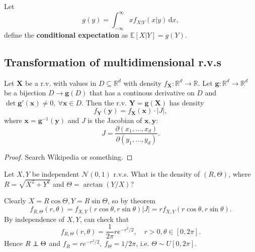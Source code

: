 \begin{definition}
    Let 
    \[
        g(y)=\int_{-\infty}^{\infty} xf_{X|Y}(x|y) \,\mathrm{d}x,
    \]
    define the \textbf{conditional expectation} as $ \mathbb{E}[X|Y]=g(Y) $.
\end{definition}

\subsection{Transformation of multidimensional r.v.s}
\begin{theorem}
    Let $\mathbf{X}$ be a r.v. with values in $ D \subseteq \mathbb{R}^{d} $ with density $ f_\mathbf{X}: \mathbb{R}^{d}\to \mathbb{R} $. Let $\mathbf{g}: \mathbb{R}^{d}\to \mathbb{R}^{d}$ be a bijection $ D \to \mathbf{g}(D) $ that has a continous derivative on $D$ and $ \det \mathbf{g}'(\mathbf{x})\neq 0,\ \forall \mathbf{x}\in D $. Then the r.v. $ \mathbf{Y}=\mathbf{g}(\mathbf{X}) $ has density 
    \[
        f_\mathbf{Y}(\mathbf{y}) = f_\mathbf{X}(\mathbf{x}) \cdot |J|,
    \]
    where $ \mathbf{x}=\mathbf{g}^{-1}(\mathbf{y}) $ and $J$ is the Jacobian of $ \mathbf{x},\mathbf{y} $:
    \[
        J = \frac{\partial (x_1,\dots,x_d)}{\partial (y_1,\dots, y_d)}.
    \]
\end{theorem}
\begin{proof}
    Search Wikipedia or something.
\end{proof}

\begin{example}
    Let $ X,Y $ be independent $ \mathcal{N}(0,1) $ r.v.s. What is the density of $ (R,\Theta) $, where $ R=\sqrt{X^2+Y^2} $ and $ \Theta = \arctan (Y/X) $?
    \begin{center}
    \end{center}
    Clearly $ X=R \cos \Theta,Y=R \sin \Theta $, so by theorem 
    \[
        f_{R,\Theta}(r,\theta) = f_{X,Y}(r \cos \theta,r \sin \theta)|J|=rf_{X,Y}(r \cos \theta,r \sin \theta).
    \]
    By independence of $ X,Y $, can check that 
    \[
        f_{R,\Theta}(r,\theta) = \frac{1}{2\pi}re^{-r^2/2},\quad r>0, \theta\in [0,2\pi].
    \]
    Hence $R \independent \Theta$ and $ f_R=re^{-r^2/2},\ f_\Theta=1/2\pi $, i.e. $ \Theta \sim U[0,2\pi] $.
\end{example}

